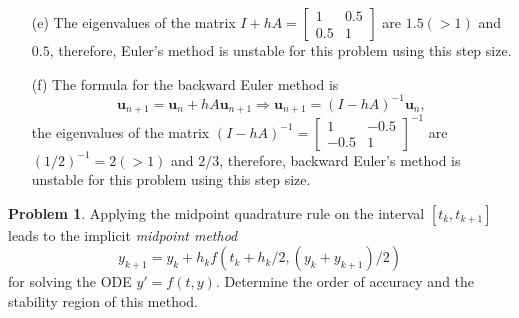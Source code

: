 \documentclass[a4paper]{book}
\makeatletter
\newenvironment{sol}[1][\solname]{\par
  \pushQED{\qed}
  \normalfont \topsep6\p@\@plus6\p@\relax
  \trivlist
  \item[\hskip\labelsep
        \itshape
    #1\@addpunct{.}]\ignorespaces
}{\popQED\endtrivlist\@endpefalse}
\providecommand{\solname}{Solution}
\numberwithin{equation}{chapter}
\theoremstyle{definition}
\newtheorem{pro}{Problem}
\makeatother
\begin{document}
\begin{sol}
\begin{itemize}
  \item[(e)]
    The eigenvalues of the matrix $I+hA = \begin{bmatrix}
        1 & 0.5 \\
        0.5 & 1
      \end{bmatrix}$ are $1.5(> 1)$ and $0.5$,
    therefore,
    Euler's method is unstable for this problem using this step size.
  
  \item[(f)]
    The formula for the backward Euler method is
    \begin{displaymath}
      \mathbf{u}_{n+1} = \mathbf{u}_n + hA\mathbf{u}_{n+1} \Rightarrow
      \mathbf{u}_{n+1} = (I-hA)^{-1}\mathbf{u}_n,
    \end{displaymath}
    the eigenvalues of the matrix $(I-hA)^{-1} = \begin{bmatrix}
        1 & -0.5 \\
        -0.5 & 1
      \end{bmatrix}^{-1}$ are $(1/2)^{-1} = 2(>1)$ and $2/3$,
    therefore,
    backward Euler's method is unstable for this problem using this step size.
  \end{itemize}
  \end{sol}
    
  \begin{pro}
    Applying the midpoint quadrature rule
    on the interval $[t_k, t_{k+1}]$ leads to the implicit
    \emph{midpoint method}
    \begin{displaymath}
      y_{k+1} = y_k + h_kf(t_k+h_k/2, (y_k+y_{k+1})/2)
    \end{displaymath}
    for solving the ODE $y'=f(t,y)$.
    Determine the order of accuracy and
    the stability region of this method.
  \end{pro}
\end{document}
